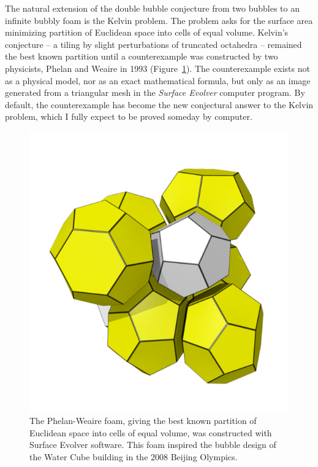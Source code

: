 \documentclass{llncs}
\begin{document}
The natural extension of the double bubble conjecture from two bubbles
to an infinite bubbly foam is the Kelvin problem.  The problem asks
for the surface area minimizing partition of Euclidean space into
cells of equal volume.  Kelvin's conjecture -- a tiling by slight
perturbations of truncated octahedra -- remained the best known
partition until a counterexample was constructed by two physicists,
Phelan and Weaire in 1993 (Figure~\ref{fig:PW}).  The counterexample
exists not as a physical model, nor as an exact mathematical formula,
but only as an image generated from a triangular mesh in the {\it
  Surface Evolver} computer program.  By default, the counterexample
has become the new conjectural answer to the Kelvin problem, which I
fully expect to be proved someday by computer.

\begin{figure}[h!]
  \centering
\includegraphics[scale=0.28]{557px-Foam_-_Weaire-Phelan_structure.png}
  \caption{The Phelan-Weaire foam, giving the best known partition of Euclidean space
into cells of equal volume, was constructed with Surface Evolver software.
This foam inspired the bubble design of the Water Cube building in the 2008 Beijing Olympics.
}
\label{fig:PW}
\end{figure}
\end{document}
